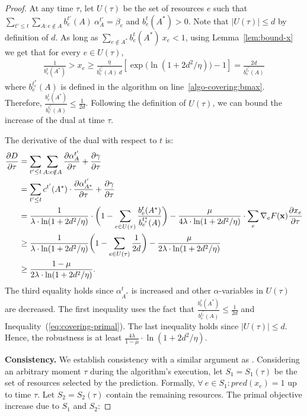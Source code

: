 \begin{proof}
At any time $\tau$, let $U(\tau)$ be the set of resources $e$ such that
$\sum_{t' \le t} \sum_{A: e \notin A} b^{t'}_{e}(A)\ \alpha^{t'}_{A} = \beta_{e}$ and $b^{t}_{e}(A^*) > 0$.
Note that $|U(\tau)| \leq d$ by definition of $d$.
As long as $\sum_{e \notin A^{*}} b^{t}_{e}(A^*)\ x_{e}  < 1$,
using Lemma~\ref{lem:bound-x} we get that for every $e \in U(\tau)$,
%
\begin{align*}
\frac{1}{b^{t}_{e}(A^*)} > x_{e} \geq \frac{\eta}{b^{t_{e}^{*}}_{e}(A) \ d}
				\left[ \exp\biggl(\ln(1+2d^{2}/\eta) \biggr) - 1 \right]
				= \frac{2 d}{b^{t_{e}^{*}}_{e}(A)}
\end{align*}
where $b^{t_{e}^{*}}_{e}(A)$ is defined in the algorithm on line~\ref{algo-covering:bmax}.
Therefore, $\frac{b^{t}_{e}(A^{*})}{b^{t_{e}^{*}}_{e}(A)} \leq \frac{1}{2d}$. Following the definition of $U(\tau)$, we can bound the increase of the dual at time $\tau$.

\noindent The derivative of the dual with respect to $t$ is:
\begin{align*}
\frac{\partial D}{\partial \tau}
&=  \sum_{t' \le t} \sum_{A : e \notin A} \frac{\partial \alpha^{t'}_{A}}{\partial \tau} + \frac{\partial \gamma}{\partial \tau} \\
&= \sum_{t' \le t} c^{t'}(A^{*}) \cdot \frac{\partial \alpha^{t'}_{A^{*}}}{\partial \tau} + \frac{\partial \gamma}{\partial \tau} \\
&= \frac{1}{\lambda \cdot \ln(1 + 2d^{2}/\eta)} \cdot \biggl(1 - \sum_{e \in U(\tau)} \frac{b^{t}_{e}(A^{*})}{b^{t_{e}^{*}}_{e}(A)} \biggr)
	- \frac{\mu}{4\lambda \cdot \ln(1 + 2d^{2}/\eta)} \cdot \sum_{e} \nabla_{e} F(\vect{x}) \frac{\partial x_{e}}{\partial \tau} \\
%
&\geq \frac{1}{\lambda \cdot \ln(1 + 2d^{2}/\eta)} \biggl(1 - \sum_{e \in U(\tau)} \frac{1}{2d} \biggr)
	- \frac{\mu}{2 \lambda \cdot \ln(1 + 2d^{2}/\eta)} \\
%
&\geq \frac{1 - \mu}{2 \lambda \cdot \ln(1 + 2d^{2}/\eta)}.
\end{align*}
The third equality holds since $\alpha^{t}_{A^{*}}$ is increased and other $\alpha$-variables in
$U(\tau)$ are decreased. The first inequality uses the fact that $\frac{b^{t}_{e}(A^{*})}{b^{t_{e}^{*}}_{e}(A)} \leq \frac{1}{2d}$
and Inequality~(\ref{eq:covering-primal}).
The last inequality holds since $|U(\tau)| \leq d$.
Hence, the robustness is at least $\frac{4 \lambda}{1 - \mu} \cdot \ln(1 + 2d^{2}/\eta)$.

\textbf{Consistency.} We establish consistency with a similar argument as \cite{BamasMaggiori20:The-Primal-Dual-method}.
Considering an arbitrary moment $\tau$ during the algorithm's execution, let $S_{1} = S_{1}(\tau)$ be the set of resources selected by the prediction. Formally, $\forall\ e \in S_{1} : pred(x_{e}) = 1$ up to time $\tau$. Let $S_{2} = S_{2}(\tau)$ contain the remaining resources.
The primal objective increase due to $S_{1}$ and $S_{2}$:


\end{proof}
